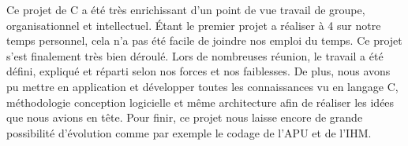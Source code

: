 Ce projet de C a été très enrichissant d'un point de vue travail de groupe, organisationnel et intellectuel. Étant le premier projet a réaliser à 4 sur notre temps personnel, cela n'a pas été facile de joindre nos emploi du temps. Ce projet s'est finalement très bien déroulé. Lors de nombreuses réunion, le travail a été défini, expliqué et réparti selon nos forces et nos faiblesses. De plus, nous avons pu mettre en application et développer toutes les connaissances vu en langage C, méthodologie conception logicielle et même architecture afin de réaliser les idées que nous avions en tête. Pour finir, ce projet nous laisse encore de grande possibilité d'évolution comme par exemple le codage de l'APU et de l'IHM.

